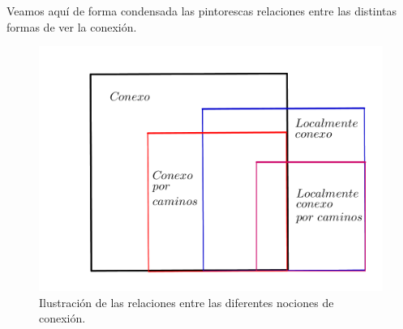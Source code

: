 Veamos aquí de forma condensada las pintorescas relaciones entre las distintas formas de ver la conexión.
\begin{figure}[h!]
	\centering
	\includegraphics[scale = 1]{img/Comparacion_conexion}
	\caption{Ilustración de las relaciones entre las diferentes nociones de conexión.}
\end{figure}
